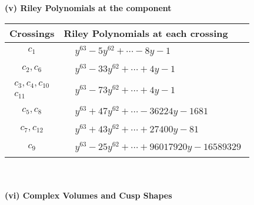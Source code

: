 \documentclass[1p]{elsarticle_modified}
\theoremstyle{definition}
\begin{document}
\newpage\renewcommand{\arraystretch}{1}
\flushleft \textbf{(v) Riley Polynomials at the component}\newline \\
\begin{tabular}{m{50pt}|m{274pt}}
Crossings & \hspace{64pt}Riley Polynomials at each crossing \\
\hline $$\begin{aligned}c_{1}\end{aligned}$$&$\begin{aligned}
&y^{63}-5 y^{62}+\cdots-8 y-1
\end{aligned}$\\
\hline $$\begin{aligned}c_{2},c_{6}\end{aligned}$$&$\begin{aligned}
&y^{63}-33 y^{62}+\cdots+4 y-1
\end{aligned}$\\
\hline $$\begin{aligned}c_{3},c_{4},c_{10}\\c_{11}\end{aligned}$$&$\begin{aligned}
&y^{63}-73 y^{62}+\cdots+4 y-1
\end{aligned}$\\
\hline $$\begin{aligned}c_{5},c_{8}\end{aligned}$$&$\begin{aligned}
&y^{63}+47 y^{62}+\cdots-36224 y-1681
\end{aligned}$\\
\hline $$\begin{aligned}c_{7},c_{12}\end{aligned}$$&$\begin{aligned}
&y^{63}+43 y^{62}+\cdots+27400 y-81
\end{aligned}$\\
\hline $$\begin{aligned}c_{9}\end{aligned}$$&$\begin{aligned}
&y^{63}-25 y^{62}+\cdots+96017920 y-16589329
\end{aligned}$\\
\hline
\end{tabular}\\~\\
\newpage\flushleft \textbf{(vi) Complex Volumes and Cusp Shapes}
\end{document}
